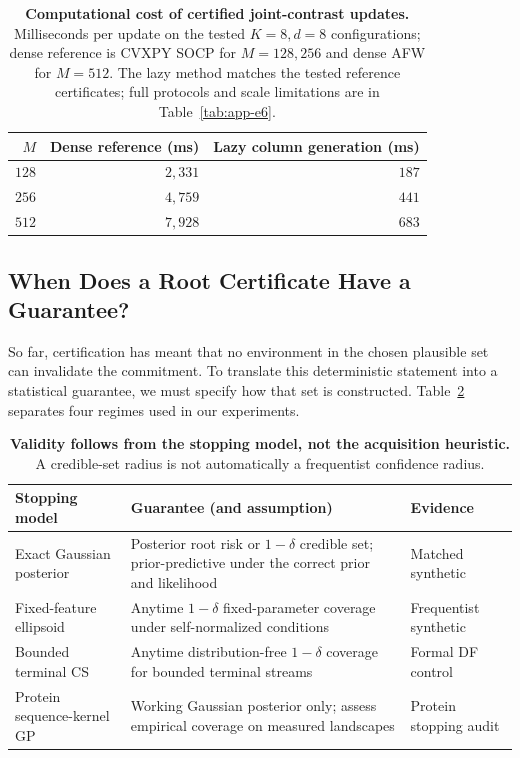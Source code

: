 \documentclass{article}
\theoremstyle{plain}
\theoremstyle{definition}
\begin{document}
\begin{table}[t]
\centering\small
\caption{\textbf{Computational cost of certified joint-contrast updates.}
Milliseconds per update on the tested $K=8,d=8$ configurations;
dense reference is CVXPY SOCP for $M=128,256$ and dense AFW for
$M=512$. The lazy method matches the tested reference certificates;
full protocols and scale limitations are in Table~\ref{tab:app-e6}.}
\label{tab:main-conic-cost}
\setlength{\tabcolsep}{7pt}
\begin{tabular}{@{}rrr@{}}
\toprule
$M$ & Dense reference (ms) & Lazy column generation (ms)\\
\midrule
$128$ & $2{,}331$ & $187$ \\
$256$ & $4{,}759$ & $441$ \\
$512$ & $7{,}928$ & $683$ \\
\bottomrule
\end{tabular}
\end{table}


\subsection{When Does a Root Certificate Have a Guarantee?}
\label{sec:validity}\label{sec:active-rule}\label{sec:active-theory}
\label{sec:ast-main}\label{sec:bay-info}

So far, certification has meant that no environment in the
chosen plausible set can invalidate the commitment. To translate
this deterministic statement into a statistical guarantee, we
must specify how that set is constructed.
Table~\ref{tab:main-validity-map} separates four regimes used
in our experiments.

\begin{table}[!htbp]
\centering
\caption{\textbf{Validity follows from the stopping model, not the acquisition heuristic.}
A credible-set radius is not automatically a frequentist confidence radius.}
\label{tab:main-validity-map}
\small\setlength{\tabcolsep}{3.5pt}
\renewcommand{\arraystretch}{1.13}
\begin{tabular}{@{}p{.26\linewidth}p{.44\linewidth}p{.23\linewidth}@{}}
\toprule
\textbf{Stopping model} & \textbf{Guarantee (and assumption)} & \textbf{Evidence}\\
\midrule
Exact Gaussian posterior &
Posterior root risk or $1-\delta$ credible set; prior-predictive under the correct prior and likelihood &
Matched synthetic\\
Fixed-feature ellipsoid &
Anytime $1-\delta$ fixed-parameter coverage under self-normalized conditions &
Frequentist synthetic\\
Bounded terminal CS &
Anytime distribution-free $1-\delta$ coverage for bounded terminal streams &
Formal DF control\\
Protein sequence-kernel GP &
Working Gaussian posterior only; assess empirical coverage on measured landscapes &
Protein stopping audit\\
\bottomrule
\end{tabular}
\end{table}
\end{document}
